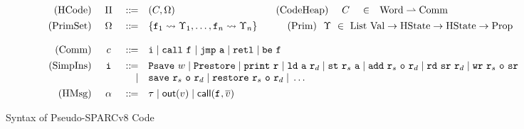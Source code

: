 \begin{figure*}[!t]
    \centering
    \small
    \[
        \begin{array}{rcclcrccl}
            \TYPE{(HCode)} & \ \HMd \ & \define & (\code, \hprimset) & &
            \qquad\,
            \TYPE{(CodeHeap)} & \ \code \ & \in & \TYPE{Word} \rightharpoonup \TYPE{Comm}
            \\
            \\[-8pt]
            \TYPE{(PrimSet)} & \hprimset & \define &
            \multicolumn{6}{l}
                {
                    \{ \lab{1} \rightsquigarrow \hprim_1, \dots, \lab{n} \rightsquigarrow \hprim_n \}
                    \qquad\quad
                    \TYPE{(Prim)} \ \ \hprim \ \in \
                    \TYPE{List} \ \TYPE{Val} \rightarrow \TYPE{HState} \rightarrow
                    \TYPE{HState} \rightarrow \TYPE{Prop}
                }  \\
            \\
            \TYPE{(Comm)} & \comm & \define &
            \multicolumn{6}{l}
            {
                \simplins{} \sepline \call{} \ \lab{}
                \sepline \jmp{} \ \aexp \sepline \retl \sepline \be{} \ \lab{}
            }
            \\
            \\[-8pt]
            \TYPE{(SimpIns)} & \simplins{} & \define &
            \multicolumn{6}{l}
            {
                \Psave \ \word \sepline \Prestore  \sepline \cprint \ \reg{} \sepline
                \ld{} \ \aexp \ \reg{d} \sepline
                \st{} \ \reg{s} \ \aexp \sepline \cadd{} \ \reg{s} \ \oexp \ \reg{d}
                \sepline
                \rd \ \sr \ \reg{d} \sepline \cwr \ \reg{s} \ \oexp \ \sr
            }
            \\
            & & \quad | &
            \multicolumn{6}{l}
            {
                \csave{} \ \reg{s} \ \oexp \ \reg{d} \sepline
                \crestore{} \ \reg{s} \ \oexp \ \reg{d} \sepline
                \dots
            }
            \\
            \\[-8pt]
            \TYPE{(HMsg)} & \hmsg & \define & \empmsg \sepline \outEvt{\val} \sepline
            \callEvt{\lab{}, \args{\val}}
        \end{array}
    \]
    \vspace{-1em}
    \caption{Syntax of Pseudo-SPARCv8 Code}
    \label{fig:syntax-of-concur-pseudo-sparc}
    \vspace{-1em}
\end{figure*}
